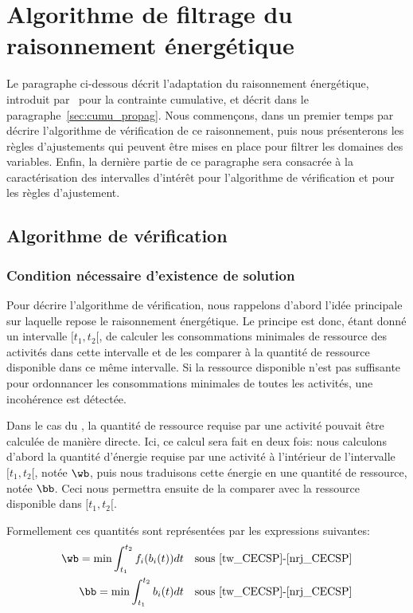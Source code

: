 \section{Algorithme de filtrage du raisonnement énergétique}
\label{sec:ER_CECSP}

Le paragraphe ci-dessous décrit l'adaptation du raisonnement
énergétique, introduit par~\cite{RELopez} pour la contrainte cumulative,
et décrit dans le paragraphe~\ref{sec:cumu_propag}. Nous commençons,
dans un premier temps par décrire l'algorithme de vérification de ce
raisonnement, puis nous présenterons les règles d'ajustements qui
peuvent être mises en place pour filtrer les domaines des
variables. Enfin, la dernière partie de ce paragraphe sera consacrée à
la caractérisation des intervalles d'intérêt pour l'algorithme de
vérification et pour les règles d'ajustement.

\subsection{Algorithme de vérification}

\subsubsection{Condition nécessaire d'existence de solution}
Pour décrire l'algorithme de vérification, nous rappelons d'abord
l'idée principale sur laquelle repose le raisonnement énergétique. Le
principe est donc, étant donné un intervalle $[t_1,t_2[$, de calculer
les consommations minimales de ressource des activités dans cette
intervalle et de les comparer à la quantité de ressource disponible
dans ce même intervalle. Si la ressource disponible n'est pas
suffisante pour ordonnancer les consommations minimales de toutes les
activités, une incohérence est détectée.

Dans le cas du \CUSP, la quantité de ressource requise par une
activité pouvait être calculée de manière directe. Ici, ce calcul sera
fait en deux fois: nous calculons d'abord la quantité d'énergie
requise par une activité à l'intérieur de l'intervalle $[t_1,t_2{[}$,
notée $\wb$, puis nous traduisons cette énergie en une quantité de
ressource, notée $\bb$. Ceci nous permettra ensuite de la comparer
avec la ressource disponible dans $[t_1,t_2{[}$.

Formellement ces quantités sont représentées par les expressions
suivantes: 
\begin{align}
  \wb= \min \int_{t_1}^{t_2} f_i(b_i(t))dt & & \text{sous 
\eqref{tw_CECSP}-\eqref{nrj_CECSP}}\\
  \bb= \min \int_{t_1}^{t_2} b_i(t)dt & & \text{sous 
\eqref{tw_CECSP}-\eqref{nrj_CECSP}}
\end{align}

